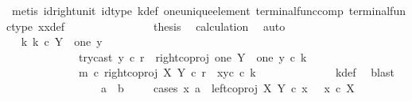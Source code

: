 \begin{isabellebody}
\ {\isacharparenleft}{\kern0pt}metis\ id{\isacharunderscore}{\kern0pt}right{\isacharunderscore}{\kern0pt}unit{}\ id{\isacharunderscore}{\kern0pt}type\ k{\isacharunderscore}{\kern0pt}def\ one{\isacharunderscore}{\kern0pt}unique{\isacharunderscore}{\kern0pt}element\ terminal{\isacharunderscore}{\kern0pt}func{\isacharunderscore}{\kern0pt}comp\ terminal{\isacharunderscore}{\kern0pt}func{\isacharunderscore}{\kern0pt}type\ x{}x{}{\isacharunderscore}{\kern0pt}def{\isacharparenleft}{\kern0pt}{}{\isacharparenright}{\kern0pt}{\isacharparenright}{\kern0pt}\isanewline
\ \ \ \ \ \ \ \ \ \ \ \ \isamarkupfalse%
\ \isamarkupfalse%
\ {\isacharquery}{\kern0pt}thesis\ \isamarkupfalse%
\ calculation\ \isamarkupfalse%
\ auto\isanewline
\ \ \ \ \ \ \ \ \ \ \isamarkupfalse%
\isanewline
\ \ \ \ \ \ \ \ \ \ \isamarkupfalse%
\ \isamarkupfalse%
\ {\isachardoublequoteopen}{\isasymexists}k{\isachardot}{\kern0pt}\ k\ {\isasymin}\isactrlsub c\ Y\ {\isasymsetminus}\ {\isacharparenleft}{\kern0pt}one{\isacharcomma}{\kern0pt}\ y{}{\isacharparenright}{\kern0pt}\ {\isasymand}\isanewline
\ \ \ \ \ \ \ \ \ \ \ \ \ try{\isacharunderscore}{\kern0pt}cast\ y{}\ {\isasymcirc}\isactrlsub c\ r\ {\isacharequal}{\kern0pt}\ right{\isacharunderscore}{\kern0pt}coproj\ one\ {\isacharparenleft}{\kern0pt}Y\ {\isasymsetminus}\ {\isacharparenleft}{\kern0pt}one{\isacharcomma}{\kern0pt}\ y{}{\isacharparenright}{\kern0pt}{\isacharparenright}{\kern0pt}\ {\isasymcirc}\isactrlsub c\ k\ {\isasymand}\isanewline
\ \ \ \ \ \ \ \ \ \ \ \ \ m\ {\isasymcirc}\isactrlsub c\ right{\isacharunderscore}{\kern0pt}coproj\ X\ Y\ {\isasymcirc}\isactrlsub c\ r\ {\isacharequal}{\kern0pt}\ {\isasymlangle}x{}{\isacharcomma}{\kern0pt}y{}\isactrlsup c\ {\isasymcirc}\isactrlsub c\ k{\isasymrangle}{\isachardoublequoteclose}\isanewline
\ \ \ \ \ \ \ \ \ \ \ \ \isamarkupfalse%
\ k{\isacharunderscore}{\kern0pt}def\ \isamarkupfalse%
\ blast\isanewline
\ \ \ \ \ \ \ \ \isamarkupfalse%
\isanewline
\isanewline
\ \ \isanewline
\ \ \ \ \isamarkupfalse%
\ {\isachardoublequoteopen}a\ {\isacharequal}{\kern0pt}\ b{\isachardoublequoteclose}\isanewline
\ \ \ \ \isamarkupfalse%
{\isacharparenleft}{\kern0pt}cases\ {\isachardoublequoteopen}{\isasymexists}x{\isachardot}{\kern0pt}\ a\ {\isacharequal}{\kern0pt}\ left{\isacharunderscore}{\kern0pt}coproj\ X\ Y\ {\isasymcirc}\isactrlsub c\ x\ \ {\isasymand}\ x\ {\isasymin}\isactrlsub c\ X{\isachardoublequoteclose}{\isacharparenright}{\kern0pt}\isanewline

\end{isabellebody}
